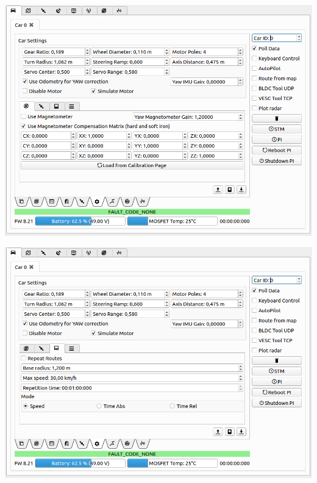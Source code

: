 \documentclass[12pt]{article} %
\begin{document}

\noindent\begin{minipage}{0.5\linewidth}
\noindent \includegraphics[width=\textwidth]{./screens/car_tab_simulate.png}
\end{minipage}
\begin{minipage}{0.5\linewidth}
\noindent \includegraphics[width=\textwidth]{./screens/car_tab_autopilot.png}
\end{minipage}
\end{document}

